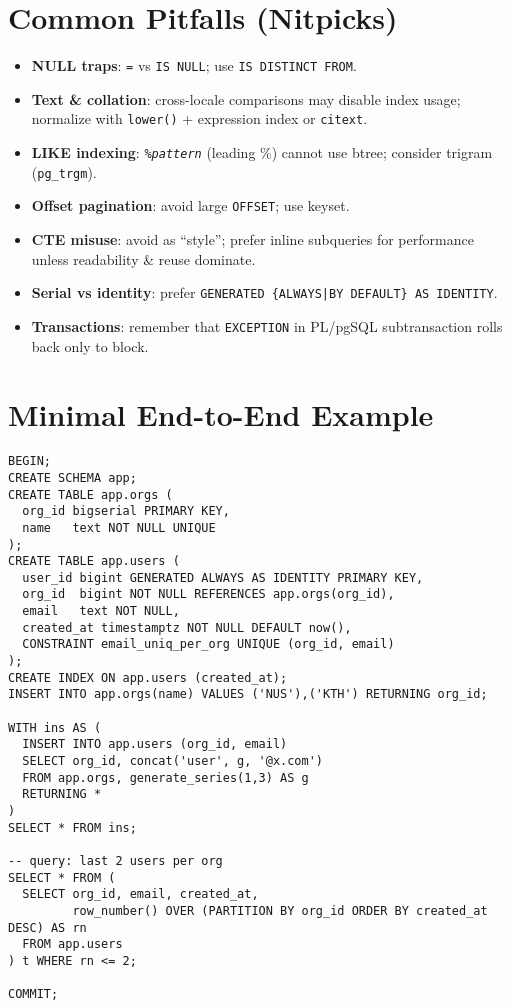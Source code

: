 \documentclass[10pt]{article}
\begin{document}
\section{Common Pitfalls (Nitpicks)}
\begin{itemize}
  \item \textbf{NULL traps}: \texttt{=} vs \texttt{IS NULL}; use \texttt{IS DISTINCT FROM}.
  \item \textbf{Text \& collation}: cross-locale comparisons may disable index usage; normalize with \texttt{lower()} + expression index or \texttt{citext}.
  \item \textbf{LIKE indexing}: \texttt{\%\textit{pattern}} (leading \%) cannot use btree; consider trigram (\texttt{pg\_trgm}).
  \item \textbf{Offset pagination}: avoid large \texttt{OFFSET}; use keyset.
  \item \textbf{CTE misuse}: avoid as “style”; prefer inline subqueries for performance unless readability \& reuse dominate.
  \item \textbf{Serial vs identity}: prefer \texttt{GENERATED \{ALWAYS|BY DEFAULT\} AS IDENTITY}.
  \item \textbf{Transactions}: remember that \texttt{EXCEPTION} in PL/pgSQL subtransaction rolls back only to block.
\end{itemize}

\section{Minimal End-to-End Example}
\begin{lstlisting}[style=psql]
BEGIN;
CREATE SCHEMA app;
CREATE TABLE app.orgs (
  org_id bigserial PRIMARY KEY,
  name   text NOT NULL UNIQUE
);
CREATE TABLE app.users (
  user_id bigint GENERATED ALWAYS AS IDENTITY PRIMARY KEY,
  org_id  bigint NOT NULL REFERENCES app.orgs(org_id),
  email   text NOT NULL,
  created_at timestamptz NOT NULL DEFAULT now(),
  CONSTRAINT email_uniq_per_org UNIQUE (org_id, email)
);
CREATE INDEX ON app.users (created_at);
INSERT INTO app.orgs(name) VALUES ('NUS'),('KTH') RETURNING org_id;

WITH ins AS (
  INSERT INTO app.users (org_id, email)
  SELECT org_id, concat('user', g, '@x.com')
  FROM app.orgs, generate_series(1,3) AS g
  RETURNING *
)
SELECT * FROM ins;

-- query: last 2 users per org
SELECT * FROM (
  SELECT org_id, email, created_at,
         row_number() OVER (PARTITION BY org_id ORDER BY created_at DESC) AS rn
  FROM app.users
) t WHERE rn <= 2;

COMMIT;
\end{lstlisting}
\end{document}
